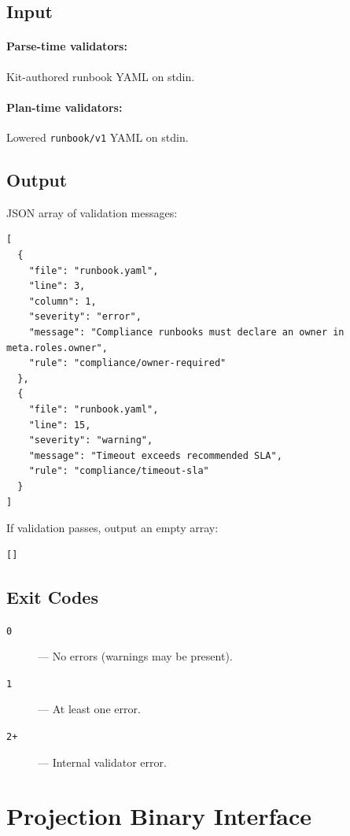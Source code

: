 \subsection{Input}

\paragraph{Parse-time validators:} Kit-authored runbook YAML on stdin.

\paragraph{Plan-time validators:} Lowered \texttt{runbook/v1} YAML on stdin.

\subsection{Output}

JSON array of validation messages:

\begin{verbatim}
[
  {
    "file": "runbook.yaml",
    "line": 3,
    "column": 1,
    "severity": "error",
    "message": "Compliance runbooks must declare an owner in meta.roles.owner",
    "rule": "compliance/owner-required"
  },
  {
    "file": "runbook.yaml",
    "line": 15,
    "severity": "warning",
    "message": "Timeout exceeds recommended SLA",
    "rule": "compliance/timeout-sla"
  }
]
\end{verbatim}

If validation passes, output an empty array:

\begin{verbatim}
[]
\end{verbatim}

\subsection{Exit Codes}

\begin{description}
  \item[\texttt{0}] --- No errors (warnings may be present).
  \item[\texttt{1}] --- At least one error.
  \item[\texttt{2+}] --- Internal validator error.
\end{description}

\section{Projection Binary Interface}
\label{sec:projection-reference}

